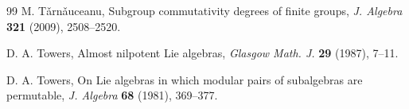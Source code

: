 \documentclass{amsart}
\theoremstyle{definition}
\numberwithin{equation}{section}
\begin{document}
\begin{thebibliography}{99}
   M. T\v{a}rn\v{a}uceanu, Subgroup commutativity degrees of finite groups, \textit{J. Algebra} \textbf{321} (2009), 2508--2520.



 D. A. Towers, Almost nilpotent Lie algebras, \textit{Glasgow Math. J.} \textbf{29} (1987), 7--11.

 D. A. Towers, On Lie algebras in which modular pairs of subalgebras are permutable, \textit{J. Algebra} \textbf{68} (1981), 369--377.








\end{thebibliography}
\end{document}

